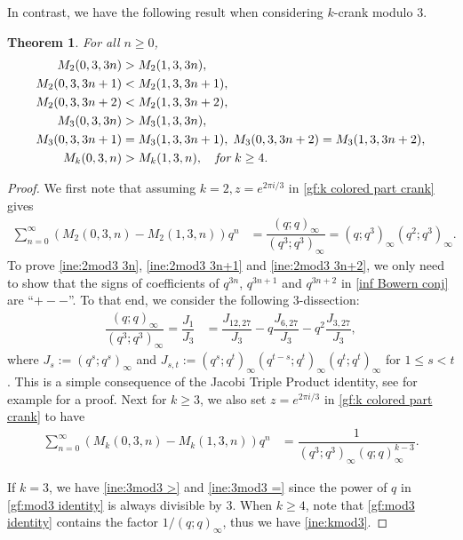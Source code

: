 \documentclass[12pt]{amsart}
\numberwithin{equation}{section}
\theoremstyle{plain}
\newtheorem{theorem}{Theorem}[section]
\theoremstyle{definition}
\begin{document}
In contrast, we have the following result when considering $k$-crank modulo $3$.
\begin{theorem}\label{+--thm}
For all $n\geq0$,
\begin{align}
\label{ine:2mod3 3n}M_{2}(0,3,3n) &>M_{2}(1,3,3n),\\
\label{ine:2mod3 3n+1}M_{2}(0,3,3n+1) &<M_{2}(1,3,3n+1),\\
\label{ine:2mod3 3n+2}M_{2}(0,3,3n+2) &<M_{2}(1,3,3n+2),\\
\label{ine:3mod3 >}M_{3}(0,3,3n) &> M_{3}(1,3,3n),\\
\label{ine:3mod3 =}M_{3}(0,3,3n+1) &= M_{3}(1,3,3n+1),\; M_{3}(0,3,3n+2) = M_{3}(1,3,3n+2),\\
\label{ine:kmod3}M_{k}(0,3,n) &> M_{k}(1,3,n),  \quad \emph{for}~k\geq4.
\end{align}
\end{theorem}
\begin{proof}
We first note that assuming $k=2, z=e^{2\pi i/3}$ in \eqref{gf:k colored part crank} gives
\begin{align}
\sum_{n=0}^{\infty}\left(M_{2}(0,3,n)-M_{2}(1,3,n)\right)q^{n} &=\dfrac{(q;q)_{\infty}}{(q^{3};q^{3})_{\infty}}=(q;q^{3})_{\infty}(q^{2};q^{3})_{\infty}.\label{inf Bowern conj}
\end{align}
To prove \eqref{ine:2mod3 3n}, \eqref{ine:2mod3 3n+1} and \eqref{ine:2mod3 3n+2}, we only need to show that the signs of coefficients of $q^{3n}$, $q^{3n+1}$ and $q^{3n+2}$ in \eqref{inf Bowern conj} are ``$+--$''. To that end, we consider the following $3$-dissection:
\begin{align*}
\dfrac{(q;q)_{\infty}}{(q^{3};q^{3})_{\infty}}=\dfrac{J_{1}}{J_{3}}&=\dfrac{J_{12,27}}{J_{3}}-q\dfrac{J_{6,27}}{J_{3}}-q^{2}\dfrac{J_{3,27}}{J_{3}},
\end{align*}
where $J_{s}:=(q^{s};q^{s})_{\infty}$ and $J_{s,t}:=(q^{s};q^{t})_{\infty}(q^{t-s};q^{t})_{\infty}(q^{t};q^{t})_{\infty}$ for $1\leq s < t$.
This is a simple consequence of the Jacobi Triple Product identity, see for example \cite[p.~48, Entry~31]{Ber} for a proof. Next for $k\geq 3$, we also set $z=e^{2\pi i/3}$ in \eqref{gf:k colored part crank} to have
\begin{align}\label{gf:mod3 identity}
\sum_{n=0}^{\infty}(M_{k}(0,3,n)-M_{k}(1,3,n))q^{n} &=\dfrac{1}{(q^{3};q^{3})_{\infty}(q;q)_{\infty}^{k-3}}.
\end{align}

If $k=3$, we have \eqref{ine:3mod3 >} and \eqref{ine:3mod3 =} since the power of $q$ in \eqref{gf:mod3 identity} is always divisible by $3$. When $k\geq4$, note that \eqref{gf:mod3 identity} contains the factor $1/(q;q)_{\infty}$, thus we have \eqref{ine:kmod3}.
\end{proof}
\end{document}
